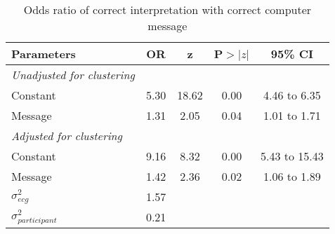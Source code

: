 \begin{table}[htbp]
\centering
\caption{Odds ratio of correct interpretation with correct computer message} 
\label{ormesgcc}
\begin{tabular}{lcccc}
  \toprule
Parameters & OR & z & P$>$$|z|$ & 95\% CI \\ 
  \midrule
\textit{Unadjusted for clustering}  &  &  &  & \\ 
  Constant & 5.30 & 18.62 & 0.00 & 4.46 to 6.35 \\ 
  Message & 1.31 & 2.05 & 0.04 & 1.01 to 1.71 \\ 
  \midrule
  \textit{Adjusted for clustering} &  &  &  & \\ 
  Constant & 9.16 & 8.32 & 0.00 & 5.43 to 15.43 \\ 
  Message & 1.42 & 2.36 & 0.02 & 1.06 to 1.89 \\ 
  \midrule 
  $\sigma^2_{ecg}$ & 1.57 &  &  &  \\ 
  $\sigma^2_{participant}$ & 0.21 &  &  &  \\ 
   \bottomrule
\end{tabular}
\end{table}
